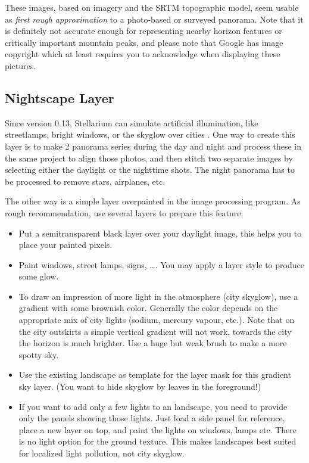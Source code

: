 These images, based on  imagery and the SRTM
topographic model, seem usable as \emph{first rough approximation} to
a photo-based or surveyed panorama. Note that it is definitely not
accurate enough for representing nearby horizon features or critically
important mountain peaks, and please note that Google has image
copyright which at least requires you to acknowledge when displaying
these pictures.

\subsection{Nightscape Layer}
\label{sec:landscapes:landscapes:Nightscape}

Since version 0.13, Stellarium can simulate artificial illumination,
like streetlamps, bright windows, or the skyglow over cities
\citep{Zotti-Wuchterl:SEAC2014}. One way to
create this layer is to make 2 panorama series during the day and night
and process these in the same  project to align those photos,
and then stitch two separate images by selecting either the daylight or the
nighttime shots. The night panorama has to be processed to remove
stars, airplanes, etc.

The other way is a simple layer overpainted in the image processing
program. As rough recommendation, use several layers to prepare this
feature:
\begin{itemize}
\item Put a semitransparent black layer over your daylight image, this
  helps you to place your painted pixels.
\item Paint windows, street lamps, signs, \ldots. You may apply a
  layer style to produce some glow.
\item To draw an impression of more light in the atmosphere (city
  skyglow), use a gradient with some brownish color. Generally the
  color depends on the appropriate mix of city lights (sodium, mercury
  vapour, etc.). Note that on the city outskirts a simple vertical
  gradient will not work, towards the city the horizon is much
  brighter. Use a huge but weak brush to make a more spotty sky.
\item Use the existing landscape as template for the layer mask for
  this gradient sky layer. (You want to hide skyglow by leaves in the
  foreground!)
\item If you want to add only a few lights to an 
  landscape, you need to provide only the panels showing those
  lights. Just load a side panel for reference, place a new layer on
  top, and paint the lights on windows, lamps etc. There is no light
  option for the ground texture. This makes 
  landscapes best suited for localized light pollution, not city
  skyglow.
\end{itemize}

